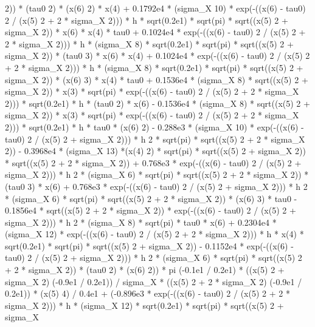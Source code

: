\begin{maplegroup}
 2)) * (tau0  2) * (x(6)  2) * x(4) + 0.1792e4 * (sigma\_X  10) * exp(-((x(6) - tau0)  2 / (x(5)  2 + 2 * sigma\_X  2))) * h * sqrt(0.2e1) * sqrt(pi) * sqrt((x(5)  2 + sigma\_X  2)) * x(6) * x(4) * tau0 + 0.1024e4 * exp(-((x(6) - tau0)  2 / (x(5)  2 + 2 * sigma\_X  2))) * h * (sigma\_X  8) * sqrt(0.2e1) * sqrt(pi) * sqrt((x(5)  2 + sigma\_X  2)) * (tau0  3) * x(6) * x(4) + 0.1024e4 * exp(-((x(6) - tau0)  2 / (x(5)  2 + 2 * sigma\_X  2))) * h * (sigma\_X  8) * sqrt(0.2e1) * sqrt(pi) * sqrt((x(5)  2 + sigma\_X  2)) * (x(6)  3) * x(4) * tau0 + 0.1536e4 * (sigma\_X  8) * sqrt((x(5)  2 + sigma\_X  2)) * x(3) * sqrt(pi) * exp(-((x(6) - tau0)  2 / (x(5)  2 + 2 * sigma\_X  2))) * sqrt(0.2e1) * h * (tau0  2) * x(6) - 0.1536e4 * (sigma\_X  8) * sqrt((x(5)  2 + sigma\_X  2)) * x(3) * sqrt(pi) * exp(-((x(6) - tau0)  2 / (x(5)  2 + 2 * sigma\_X  2))) * sqrt(0.2e1) * h * tau0 * (x(6)  2) - 0.288e3 * (sigma\_X  10) * exp(-((x(6) - tau0)  2 / (x(5)  2 + sigma\_X  2))) * h  2 * sqrt(pi) * sqrt((x(5)  2 + 2 * sigma\_X  2)) - 0.3968e4 * (sigma\_X  13) *(x(4)  2) * sqrt(pi) * sqrt((x(5)  2 + sigma\_X  2)) * sqrt((x(5)  2 + 2 * sigma\_X  2)) + 0.768e3 * exp(-((x(6) - tau0)  2 / (x(5)  2 + sigma\_X  2))) * h  2 * (sigma\_X  6) * sqrt(pi) * sqrt((x(5)  2 + 2 * sigma\_X  2)) * (tau0  3) * x(6) + 0.768e3 * exp(-((x(6) - tau0)  2 / (x(5)  2 + sigma\_X  2))) * h  2 * (sigma\_X  6) * sqrt(pi) * sqrt((x(5)  2 + 2 * sigma\_X  2)) * (x(6)  3) * tau0 - 0.1856e4 * sqrt((x(5)  2 + 2 * sigma\_X  2)) * exp(-((x(6) - tau0)  2 / (x(5)  2 + sigma\_X  2))) * h 2 * (sigma\_X  8) * sqrt(pi) * tau0 * x(6) + 0.2304e4 * (sigma\_X  12) * exp(-((x(6) - tau0)  2 / (x(5)  2 + 2 * sigma\_X  2))) * h * x(4) * sqrt(0.2e1) * sqrt(pi) * sqrt((x(5)  2 + sigma\_X  2)) - 0.1152e4 * exp(-((x(6) - tau0)  2 / (x(5)  2 + sigma\_X  2))) * h  2 * (sigma\_X  6) * sqrt(pi) * sqrt((x(5)  2 + 2 * sigma\_X  2)) * (tau0  2) * (x(6)  2)) * pi  (-0.1e1 / 0.2e1) * ((x(5)  2 + sigma\_X  2)  (-0.9e1 / 0.2e1)) / sigma\_X * ((x(5)  2 + 2 * sigma\_X  2)  (-0.9e1 / 0.2e1)) * (x(5)  4) / 0.4e1 + (-0.896e3 * exp(-((x(6) - tau0)  2 / (x(5)  2 + 2 * sigma\_X  2))) * h * (sigma\_X  12) * sqrt(0.2e1) * sqrt(pi) * sqrt((x(5)  2 + sigma\_X  
\end{maplegroup}
